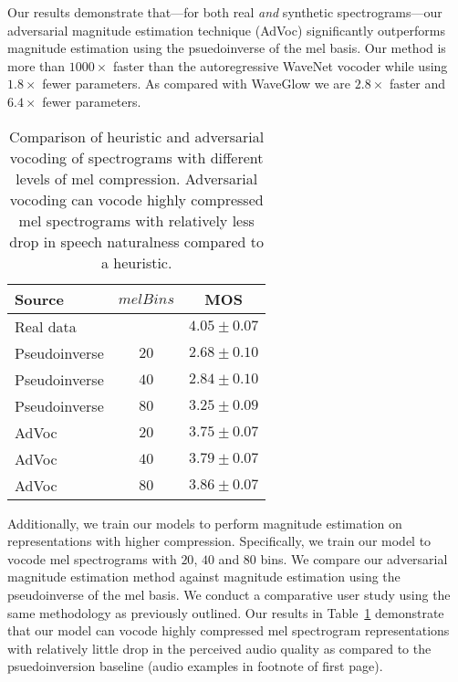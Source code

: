 \documentclass[a4paper]{article}
\begin{document}
Our results demonstrate that---for both real \emph{and} synthetic spectrograms---our adversarial magnitude estimation technique (AdVoc) significantly outperforms magnitude estimation using the psuedoinverse of the mel basis.
Our method is more than $1000 \times$ faster than the autoregressive WaveNet vocoder while using $1.8 \times$ fewer parameters. 
As compared with WaveGlow we are $2.8 \times$ faster and $6.4 \times$ fewer parameters. 

\begin{table}[t]
\centering
\caption{Comparison of heuristic and adversarial vocoding of spectrograms with different levels of mel compression. Adversarial vocoding can vocode highly compressed mel spectrograms with relatively less drop in speech naturalness compared to a heuristic.}
\footnotesize
\begin{tabular}{lcc}
\toprule
Source & $melBins$ & MOS \\
\midrule
Real data & & $4.05 \pm 0.07$ \\
Pseudoinverse & $20$ & $2.68 \pm 0.10$ \\
Pseudoinverse & $40$ & $2.84 \pm 0.10$ \\
Pseudoinverse & $80$ & $3.25 \pm 0.09$ \\
AdVoc & $20$ & $3.75 \pm 0.07$ \\
AdVoc & $40$ & $3.79 \pm 0.07$ \\
AdVoc & $80$ & $3.86 \pm 0.07$ \\
\bottomrule
\end{tabular}
\label{tab:compression}
\end{table}

Additionally, we train our models to perform magnitude estimation on representations with higher compression. 
Specifically, we train our model to vocode mel spectrograms with $20$, $40$ and $80$ bins. 
We compare our adversarial magnitude estimation method against magnitude estimation using the pseudoinverse of the mel basis. 
We conduct a comparative user study using the same methodology as previously outlined. 
Our results in 
Table~\ref{tab:compression} demonstrate that our model can vocode highly compressed mel spectrogram representations with relatively little drop in the perceived audio quality as compared to the psuedoinversion baseline (audio examples in footnote of first page).
\end{document}
